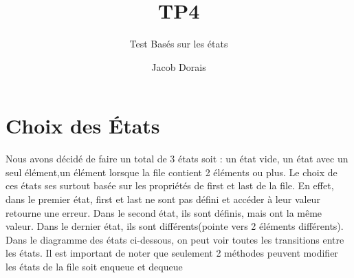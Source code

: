 \documentclass[11pt]{article}
\title{TP4}
\subtitle{Test Basés sur les états}
\author{Jacob Dorais}{Billy Bouchard}{Gr 02}
\begin{document}
\maketitle
\section{Choix des États}
Nous avons décidé de faire un total de 3 états soit : un état vide, un état avec un seul élément,un élément lorsque la file contient 2 éléments ou plus.
Le choix de ces états ses surtout basée sur les propriétés de first et last de la file.
En effet, dans le premier état, first et last ne sont pas défini et accéder à leur valeur retourne une erreur.
Dans le second état, ils sont définis, mais ont la même valeur.
Dans le dernier état, ils sont différents(pointe vers 2 éléments différents).
Dans le diagramme des états ci-dessous, on peut voir toutes les transitions entre les états.
Il est important de noter que seulement 2 méthodes peuvent modifier les états de la file soit enqueue et dequeue
\end{document}
